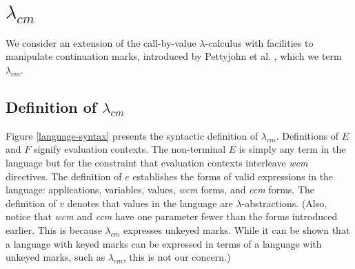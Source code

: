 \documentclass[ms,electronic,twosidetoc,letterpaper,chaptercenter,parttop]{byumsphd}
\begin{document}




\chapter{$\lambda_{cm}$}

We consider an extension of the call-by-value $\lambda$-calculus with facilities to
manipulate continuation marks, introduced by Pettyjohn et al.
\cite{pettyjohn2005continuations}, which we term $\lambda_{cm}$.

\section{Definition of $\lambda_{cm}$}

Figure \ref{language-syntax} presents the syntactic definition of $\lambda_{cm}$.
Definitions of $E$ and $F$ signify evaluation contexts. The non-terminal $E$ is simply any
term in the language but for the constraint that evaluation contexts interleave \emph{wcm}
directives. The definition of $e$ establishes the forms of valid expressions in the
language: applications, variables, values, \emph{wcm} forms, and \emph{ccm} forms. The
definition of $v$ denotes that values in the language are $\lambda$-abstractions. (Also,
notice that \emph{wcm} and \emph{ccm} have one parameter fewer than the forms introduced
earlier. This is because $\lambda_{cm}$ expresses unkeyed marks. While it can be shown
that a language with keyed marks can be expressed in terms of a language with unkeyed
marks, such as $\lambda_{cm}$, this is not our concern.)
\end{document}
